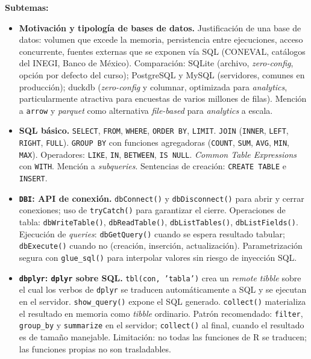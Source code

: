 \documentclass[11pt,letterpaper]{article}
\begin{document}
\textbf{Subtemas:}

\begin{itemize}[leftmargin=*, itemsep=2pt]
    \item \textbf{Motivación y tipología de bases de datos.} Justificación de una base de datos: volumen que excede la memoria, persistencia entre ejecuciones, acceso concurrente, fuentes externas que se exponen vía SQL (CONEVAL, catálogos del INEGI, Banco de México). Comparación: SQLite (archivo, \textit{zero-config}, opción por defecto del curso); PostgreSQL y MySQL (servidores, comunes en producción); duckdb (\textit{zero-config} y columnar, optimizada para \textit{analytics}, particularmente atractiva para encuestas de varios millones de filas). Mención a \texttt{arrow} y \textit{parquet} como alternativa \textit{file-based} para \textit{analytics} a escala.
    \item \textbf{SQL básico.} \texttt{SELECT}, \texttt{FROM}, \texttt{WHERE}, \texttt{ORDER BY}, \texttt{LIMIT}. \texttt{JOIN} (\texttt{INNER}, \texttt{LEFT}, \texttt{RIGHT}, \texttt{FULL}). \texttt{GROUP BY} con funciones agregadoras (\texttt{COUNT}, \texttt{SUM}, \texttt{AVG}, \texttt{MIN}, \texttt{MAX}). Operadores: \texttt{LIKE}, \texttt{IN}, \texttt{BETWEEN}, \texttt{IS NULL}. \textit{Common Table Expressions} con \texttt{WITH}. Mención a \textit{subqueries}. Sentencias de creación: \texttt{CREATE TABLE} e \texttt{INSERT}.
    \item \textbf{\texttt{DBI}: API de conexión.} \texttt{dbConnect()} y \texttt{dbDisconnect()} para abrir y cerrar conexiones; uso de \texttt{tryCatch()} para garantizar el cierre. Operaciones de tabla: \texttt{dbWriteTable()}, \texttt{dbReadTable()}, \texttt{dbListTables()}, \texttt{dbListFields()}. Ejecución de \textit{queries}: \texttt{dbGetQuery()} cuando se espera resultado tabular; \texttt{dbExecute()} cuando no (creación, inserción, actualización). Parametrización segura con \texttt{glue\_sql()} para interpolar valores sin riesgo de inyección SQL.
    \item \textbf{\texttt{dbplyr}: \texttt{dplyr} sobre SQL.} \texttt{tbl(con, 'tabla')} crea un \textit{remote tibble} sobre el cual los verbos de \texttt{dplyr} se traducen automáticamente a SQL y se ejecutan en el servidor. \texttt{show\_query()} expone el SQL generado. \texttt{collect()} materializa el resultado en memoria como \textit{tibble} ordinario. Patrón recomendado: \texttt{filter}, \texttt{group\_by} y \texttt{summarize} en el servidor; \texttt{collect()} al final, cuando el resultado es de tamaño manejable. Limitación: no todas las funciones de R se traducen; las funciones propias no son trasladables.
\end{itemize}
\end{document}

